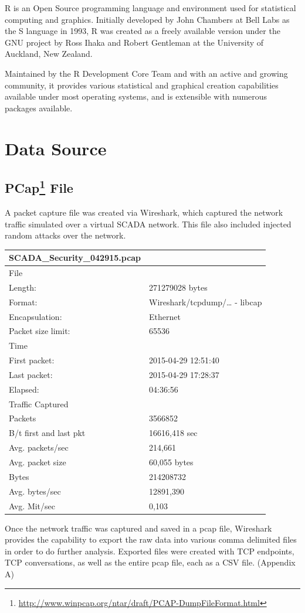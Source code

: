 \documentclass[]{article}
\let\rmarkdownfootnote\footnote%
\def\footnote{\protect\rmarkdownfootnote}
\begin{document}
R is an Open Source programming language and environment used for
statistical computing and graphics. Initially developed by John Chambers
at Bell Labs as the S language in 1993, R was created as a freely
available version under the GNU project by Ross Ihaka and Robert
Gentleman at the University of Auckland, New Zealand.

Maintained by the R Development Core Team and with an active and growing
community, it provides various statistical and graphical creation
capabilities available under most operating systems, and is extensible
with numerous packages available.

\section{Data Source}\label{data-source}

\subsection[PCap File]{PCap\footnote{\url{http://www.winpcap.org/ntar/draft/PCAP-DumpFileFormat.html}}
File}\label{pcap4-file}

A packet capture file was created via Wireshark, which captured the
network traffic simulated over a virtual SCADA network. This file also
included injected random attacks over the network.

\begin{longtable}[c]{@{}ll@{}}
\toprule
SCADA\_Security\_042915.pcap &\tabularnewline
\midrule
\endhead
File &\tabularnewline
Length: & 271279028 bytes\tabularnewline
Format: & Wireshark/tcpdump/\ldots{} - libcap\tabularnewline
Encapsulation: & Ethernet\tabularnewline
Packet size limit: & 65536\tabularnewline
Time &\tabularnewline
First packet: & 2015-04-29 12:51:40\tabularnewline
Last packet: & 2015-04-29 17:28:37\tabularnewline
Elapsed: & 04:36:56\tabularnewline
Traffic Captured &\tabularnewline
Packets & 3566852\tabularnewline
B/t first and last pkt & 16616,418 sec\tabularnewline
Avg. packets/sec & 214,661\tabularnewline
Avg. packet size & 60,055 bytes\tabularnewline
Bytes & 214208732\tabularnewline
Avg. bytes/sec & 12891,390\tabularnewline
Avg. Mit/sec & 0,103\tabularnewline
\bottomrule
\end{longtable}

Once the network traffic was captured and saved in a pcap file,
Wireshark provides the capability to export the raw data into various
comma delimited files in order to do further analysis. Exported files
were created with TCP endpoints, TCP conversations, as well as the
entire pcap file, each as a CSV file. (Appendix A)
\end{document}
